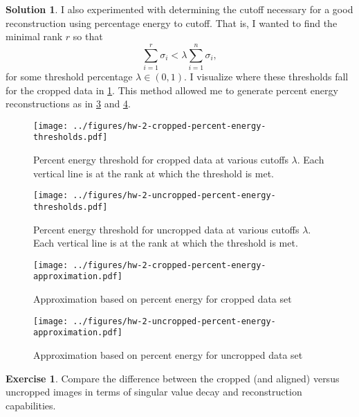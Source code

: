 \documentclass[12pt]{article}
\theoremstyle{definition}
\newtheorem{exer}{Exercise}
\newtheorem{sol}{Solution}
\theoremstyle{remark}
\begin{document}
\begin{sol}
    I also experimented with determining the cutoff necessary for a good reconstruction using percentage energy to cutoff. That is, I wanted to find the minimal rank $r$ so that
    \begin{equation}
        \sum_{i=1}^r \sigma_i < \lambda \sum_{i=1}^{n} \sigma_i,
    \end{equation}
    for some threshold percentage $\lambda\in(0,1)$. I visualize where these thresholds fall for the cropped data in \cref{fig:cropped-percent-energy-thresholds}. This method allowed me to generate percent energy reconstructions as in \cref{fig:cropped-percent-energy-approximation} and \cref{fig:uncropped-percent-energy-approximation}.
    \begin{figure}[]
        \centering
        \texttt{[image: ../figures/hw-2-cropped-percent-energy-thresholds.pdf]}
        \caption{Percent energy threshold for cropped data at various cutoffs $\lambda$. Each vertical line is at the rank at which the threshold is met.}%
        \label{fig:cropped-percent-energy-thresholds}
    \end{figure}
    \begin{figure}[]
        \centering
        \texttt{[image: ../figures/hw-2-uncropped-percent-energy-thresholds.pdf]}
        \caption{Percent energy threshold for uncropped data at various cutoffs $\lambda$. Each vertical line is at the rank at which the threshold is met.}%
        \label{fig:uncropped-percent-energy-thresholds}
    \end{figure}

    \begin{figure}[]
        \centering
        \texttt{[image: ../figures/hw-2-cropped-percent-energy-approximation.pdf]}
        \caption{Approximation based on percent energy for cropped data set}%
        \label{fig:cropped-percent-energy-approximation}
    \end{figure}
    \begin{figure}[]
        \centering
        \texttt{[image: ../figures/hw-2-uncropped-percent-energy-approximation.pdf]}
        \caption{Approximation based on percent energy for uncropped data set}%
        \label{fig:uncropped-percent-energy-approximation}
    \end{figure}
\end{sol}


\begin{exer}
Compare the difference between the cropped (and aligned) versus uncropped images in terms of singular
value decay and reconstruction capabilities.
\end{exer}
\end{document}
